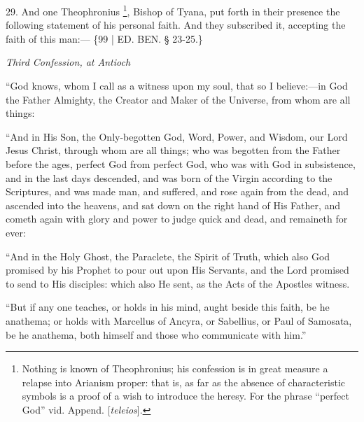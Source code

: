 29. And one Theophronius \footnote{Nothing is known of Theophronius; his confession is in great measure a
relapse into Arianism proper: that is, as far as the absence of
characteristic symbols is a proof of a wish to introduce the heresy.
For the phrase ``perfect God'' vid. Append. [\emph{teleios}].}, Bishop of Tyana, put forth in their presence the following
statement of his personal faith. And they subscribed it, accepting the
faith of this man:— \{99 | ED.
BEN. § 23-25.\}

\emph{Third
Confession, at Antioch}

``God knows, whom I call as a
witness upon my soul, that so I believe:—in God the Father Almighty,
the Creator and Maker of the Universe, from whom are all things:

``And in His Son, the
Only-begotten God, Word, Power, and Wisdom, our Lord Jesus Christ,
through whom are all things; who was begotten from the Father before
the ages, perfect God from perfect God, who was with God in
subsistence, and in the last days descended, and was born of the
Virgin according to the Scriptures, and was made man, and suffered,
and rose again from the dead, and ascended into the heavens, and sat
down on the right hand of His Father, and cometh again with glory and
power to judge quick and dead, and remaineth for ever:

``And in the Holy Ghost, the
Paraclete, the Spirit of Truth, which also God promised by his Prophet
to pour out upon His Servants, and the Lord promised to send to His
disciples: which also He sent, as the Acts of the Apostles witness.

``But if any one teaches, or
holds in his mind, aught beside this faith, be he anathema; or holds
with Marcellus of Ancyra, or Sabellius, or Paul of Samosata, be he
anathema, both himself and those who communicate with him.''

